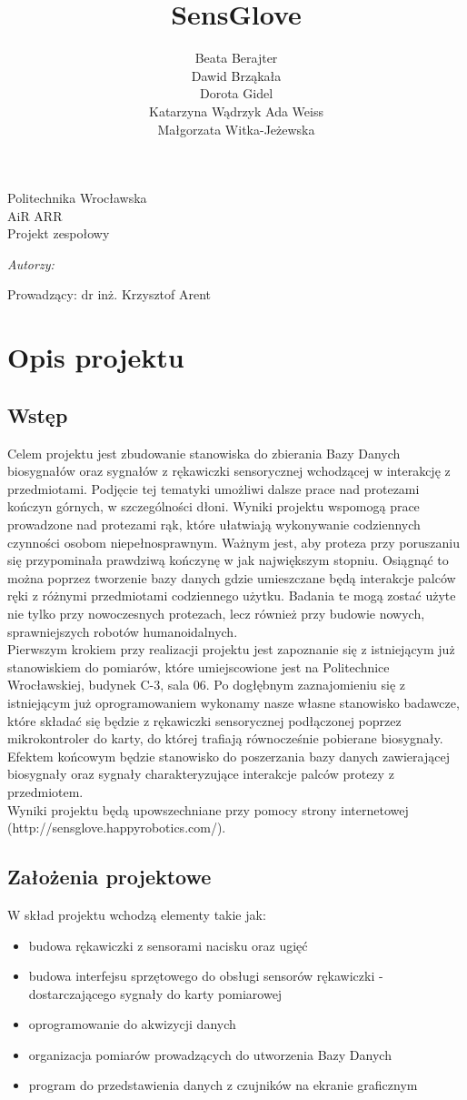 \documentclass{article}
\author{Beata Berajter\\
Dawid Brząkała\\
Dorota Gidel\\
Katarzyna Wądrzyk
Ada Weiss\\
Małgorzata Witka-Jeżewska\\
 }%
\title{SensGlove}
\makeatletter
\renewcommand{\maketitle}{\begin{titlepage}
    \vspace*{1cm}
    \begin{center}
    Politechnika Wrocławska\\
    AiR ARR\\
 Projekt zespołowy
    \end{center}
      \vspace{3cm}
    \begin{center}

     \LARGE \textsc {\@title}
         \end{center}
     \vspace{1cm}

    \begin{center}
    \textit{ Autorzy:}\\
   \textit{\@author}
     \end{center}
      \vspace{1cm}

     \begin{center}

    Prowadzący:
  dr inż. Krzysztof Arent %
    \end{center}

    \vspace*{\stretch{6}}
    \begin{center}
    \@date
    \end{center}
  \end{titlepage}
}
\makeatother
\begin{document}
\maketitle
\newpage
\tableofcontents
\newpage
\section{Opis projektu}
\subsection{Wstęp}
Celem projektu jest zbudowanie stanowiska do zbierania Bazy Danych biosygnałów oraz sygnałów z rękawiczki sensorycznej wchodzącej w interakcję z przedmiotami. Podjęcie tej tematyki umożliwi dalsze prace nad protezami kończyn górnych, w szczególności dłoni. Wyniki projektu wspomogą prace prowadzone nad protezami rąk, które ułatwiają wykonywanie codziennych czynności osobom niepełnosprawnym. Ważnym jest, aby proteza przy poruszaniu się przypominała prawdziwą kończynę w jak największym stopniu. Osiągnąć to można poprzez tworzenie bazy danych gdzie umieszczane będą interakcje palców ręki z różnymi przedmiotami codziennego użytku.
Badania te mogą zostać użyte nie tylko przy nowoczesnych protezach, lecz również przy budowie nowych, sprawniejszych robotów humanoidalnych.\\
Pierwszym krokiem przy realizacji projektu jest zapoznanie się z istniejącym już stanowiskiem do pomiarów, które umiejscowione jest na Politechnice Wrocławskiej, budynek C-3, sala 06. Po dogłębnym zaznajomieniu się z istniejącym już oprogramowaniem wykonamy nasze własne stanowisko badawcze, które składać się będzie z rękawiczki sensorycznej podłączonej poprzez mikrokontroler do karty, do której trafiają równocześnie pobierane biosygnały.\\
Efektem końcowym będzie stanowisko do poszerzania bazy danych zawierającej biosygnały oraz sygnały charakteryzujące interakcje palców protezy z przedmiotem.\\
Wyniki projektu będą upowszechniane przy pomocy strony internetowej (http://sensglove.happyrobotics.com/).\\

\subsection{Założenia projektowe}
W skład projektu wchodzą elementy takie jak:
\begin{itemize}
\item budowa rękawiczki z sensorami nacisku oraz ugięć
\item budowa interfejsu sprzętowego do obsługi sensorów rękawiczki - dostarczającego sygnały do karty pomiarowej
\item oprogramowanie do akwizycji danych
\item organizacja pomiarów prowadzących do utworzenia Bazy Danych
\item program do przedstawienia danych z czujników na ekranie graficznym
\end{itemize}
\end{document}

